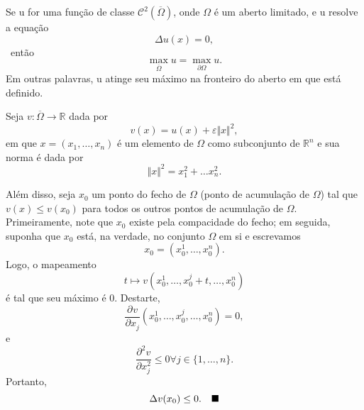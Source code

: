 \documentclass[../pde_notes.tex]{subfiles}
\begin{document}
\hypertarget{maximum_principle}{
	\begin{theorem*}
		Se u for uma função de classe \(\mathcal{C}^{2}(\overline{\Omega })\), onde \(\Omega \) é um aberto limitado, e u resolve a equação
		\[
			\Delta u(x) = 0,
		\]\
		então
		\[
			\max\limits_{\overline{\Omega }} u = \max\limits_{\partial \Omega }u.
		\]
		Em outras palavras, u atinge seu máximo na fronteiro do aberto em que está definido.
	\end{theorem*}}
\begin{proof*}
	Seja \(v:\overline{\Omega} \rightarrow \mathbb{R}\) dada por
	\[
		v(x) = u(x) + \varepsilon \Vert x \Vert^{2},
	\]
	em que \(x = (x_1, \dotsc , x_{n})\) é um elemento de \(\Omega \) como subconjunto de \(\mathbb{R}^{n}\) e sua norma é dada por
	\[
		\Vert x \Vert^{2} = x_{1}^{2} + \dotsc x_{n}^{2}.
	\]

	Além disso, seja \(x_{0}\) um ponto do fecho de \(\Omega \) (ponto de acumulação de \(\Omega \)) tal que \(v(x)\leq v(x_{0})\) para todos os outros pontos de acumulação de \(\Omega \). Primeiramente, note que \(x_{0}\) existe pela compacidade do fecho; em seguida, suponha que \(x_{0}\) está, na verdade, no conjunto \(\Omega \) em si e escrevamos
	\[
		x_{0} = (x_{0}^{1}, \dotsc , x_{0}^{n}).
	\]
	Logo, o mapeamento
	\[
		t\mapsto v(x_{0}^{1}, \dotsc , x_{0}^{j}+t, \dotsc , x_{0}^{n})
	\]
	é tal que seu máximo é 0. Destarte,
	\[
		\frac{\partial^{}v}{\partial x_{j}^{}}(x_{0}^{1}, \dotsc , x_{0}^{j}, \dotsc , x_{0}^{n}) = 0,
	\]
	e
	\[
		\frac{\partial^{2}v}{\partial x_{j}^{2}} \leq 0 \forall j\in \{1, \dotsc , n\}.
	\]
	Portanto,
	\[
		\Delta v(x_{0}) \leq 0. \quad \text{$\blacksquare$}
	\]
\end{proof*}
\end{document}
